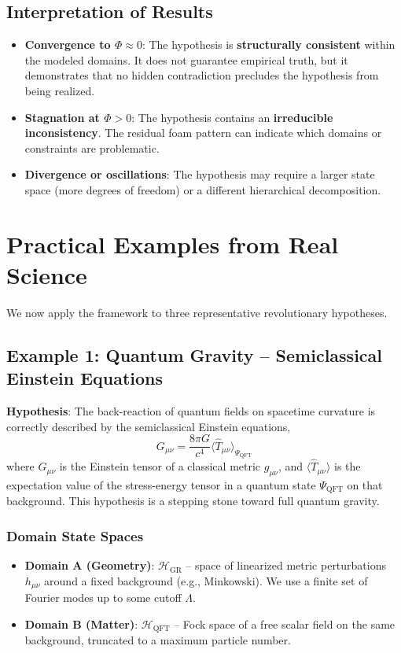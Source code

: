 \documentclass[11pt,a4paper]{article}
\begin{document}
\subsection{Interpretation of Results}
\begin{itemize}
    \item \textbf{Convergence to \(\Phi \approx 0\)}: The hypothesis is \textbf{structurally consistent} within the modeled domains. It does not guarantee empirical truth, but it demonstrates that no hidden contradiction precludes the hypothesis from being realized.
    \item \textbf{Stagnation at \(\Phi > 0\)}: The hypothesis contains an \textbf{irreducible inconsistency}. The residual foam pattern can indicate which domains or constraints are problematic.
    \item \textbf{Divergence or oscillations}: The hypothesis may require a larger state space (more degrees of freedom) or a different hierarchical decomposition.
\end{itemize}

\section{Practical Examples from Real Science}

We now apply the framework to three representative revolutionary hypotheses.

\subsection{Example 1: Quantum Gravity – Semiclassical Einstein Equations}

\textbf{Hypothesis}: The back-reaction of quantum fields on spacetime curvature is correctly described by the semiclassical Einstein equations,
\begin{equation}
G_{\mu\nu} = \frac{8\pi G}{c^4} \langle \hat{T}_{\mu\nu} \rangle_{\Psi_{\text{QFT}}}
\end{equation}
where \(G_{\mu\nu}\) is the Einstein tensor of a classical metric \(g_{\mu\nu}\), and \(\langle \hat{T}_{\mu\nu} \rangle\) is the expectation value of the stress-energy tensor in a quantum state \(\Psi_{\text{QFT}}\) on that background. This hypothesis is a stepping stone toward full quantum gravity.

\subsubsection{Domain State Spaces}
\begin{itemize}
    \item \textbf{Domain A (Geometry)}: \(\mathcal{H}_{\text{GR}}\) – space of linearized metric perturbations \(h_{\mu\nu}\) around a fixed background (e.g., Minkowski). We use a finite set of Fourier modes up to some cutoff \(\Lambda\).
    \item \textbf{Domain B (Matter)}: \(\mathcal{H}_{\text{QFT}}\) – Fock space of a free scalar field on the same background, truncated to a maximum particle number.
\end{itemize}
\end{document}
